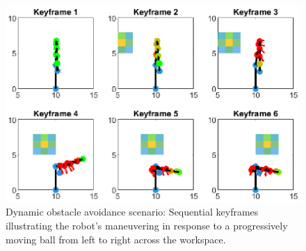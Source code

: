\documentclass[letterpaper, 10 pt, conference]{ieeeconf}  %
\begin{document}
%
%
%
%
\begin{figure}
	\centering
	\includegraphics[width=1\linewidth]{keyframes_2D_ball.eps} %
	\caption{Dynamic obstacle avoidance scenario: Sequential keyframes illustrating the robot’s maneuvering in response to a progressively moving ball from left to right across the workspace.}
	\label{fig:keyframes-3d-ball}
\end{figure}
%
%
\end{document}
